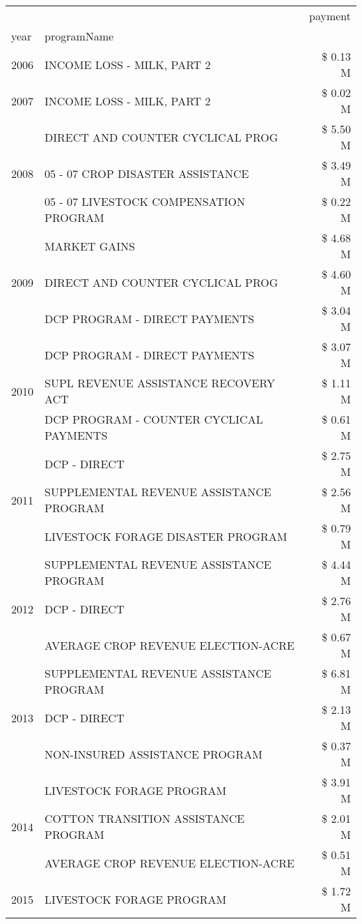 \begin{tabular}{llr}
\toprule
 &  & payment \\
year & programName &  \\
\midrule
2006 & INCOME LOSS - MILK, PART 2 & \$ 0.13 M \\
\cline{1-3}
2007 & INCOME LOSS - MILK, PART 2 & \$ 0.02 M \\
\cline{1-3}
\multirow[t]{3}{*}{2008} & DIRECT AND COUNTER CYCLICAL PROG & \$ 5.50 M \\
 & 05 - 07 CROP DISASTER ASSISTANCE & \$ 3.49 M \\
 & 05 - 07 LIVESTOCK COMPENSATION PROGRAM & \$ 0.22 M \\
\cline{1-3}
\multirow[t]{3}{*}{2009} & MARKET GAINS & \$ 4.68 M \\
 & DIRECT AND COUNTER CYCLICAL PROG & \$ 4.60 M \\
 & DCP PROGRAM - DIRECT PAYMENTS & \$ 3.04 M \\
\cline{1-3}
\multirow[t]{3}{*}{2010} & DCP PROGRAM - DIRECT PAYMENTS & \$ 3.07 M \\
 & SUPL REVENUE ASSISTANCE RECOVERY ACT & \$ 1.11 M \\
 & DCP PROGRAM - COUNTER CYCLICAL PAYMENTS & \$ 0.61 M \\
\cline{1-3}
\multirow[t]{3}{*}{2011} & DCP - DIRECT & \$ 2.75 M \\
 & SUPPLEMENTAL REVENUE ASSISTANCE PROGRAM & \$ 2.56 M \\
 & LIVESTOCK FORAGE DISASTER PROGRAM & \$ 0.79 M \\
\cline{1-3}
\multirow[t]{3}{*}{2012} & SUPPLEMENTAL REVENUE ASSISTANCE PROGRAM & \$ 4.44 M \\
 & DCP - DIRECT & \$ 2.76 M \\
 & AVERAGE CROP REVENUE ELECTION-ACRE & \$ 0.67 M \\
\cline{1-3}
\multirow[t]{3}{*}{2013} & SUPPLEMENTAL REVENUE ASSISTANCE PROGRAM & \$ 6.81 M \\
 & DCP - DIRECT & \$ 2.13 M \\
 & NON-INSURED ASSISTANCE PROGRAM & \$ 0.37 M \\
\cline{1-3}
\multirow[t]{3}{*}{2014} & LIVESTOCK FORAGE PROGRAM & \$ 3.91 M \\
 & COTTON TRANSITION ASSISTANCE PROGRAM & \$ 2.01 M \\
 & AVERAGE CROP REVENUE ELECTION-ACRE & \$ 0.51 M \\
\cline{1-3}
\multirow[t]{3}{*}{2015} & LIVESTOCK FORAGE PROGRAM & \$ 1.72 M \\

\end{tabular}
